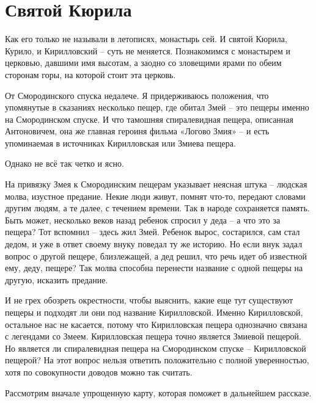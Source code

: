 \chapter{Святой Кюрила}

Как его только не называли в летописях, монастырь сей. И святой Кюрила, Курило, и Кирилловский – суть не меняется. Познакомимся с монастырем и церковью, давшими имя высотам, а заодно со зловещими ярами по обеим сторонам горы, на которой стоит эта церковь.

От Смородинского спуска недалече. Я придерживаюсь положения, что упомянутые в сказаниях несколько пещер, где обитал Змей – это пещеры именно на Смородинском спуске. И что тамошняя спиралевидная пещера, описанная Антоновичем, она же главная героиня фильма «Логово Змия» – и есть упоминаемая в источниках Кирилловская или Змиева пещера.

Однако не всё так четко и ясно.

На привязку Змея к Смородинским пещерам указывает неясная штука – людская молва, изустное предание. Некие люди живут, помнят что-то, передают словами другим людям, а те далее, с течением времени. Так в народе сохраняется память. Быть может, несколько веков назад ребенок спросил у деда – а что это за пещера? Тот вспомнил – здесь жил Змей. Ребенок вырос, состарился, сам стал дедом, и уже в ответ своему внуку поведал ту же историю. Но если внук задал вопрос о другой пещере, близлежащей, а дед решил, что речь идет об известной ему, деду, пещере? Так молва способна перенести название с одной пещеры на другую, исказить предание.

И не грех обозреть окрестности, чтобы выяснить, какие еще тут существуют пещеры и подходят ли они под название Кирилловской. Именно Кирилловской, остальное нас не касается, потому что Кирилловская пещера однозначно связана с легендами со Змеем. Кирилловская пещера точно является Змиевой пещерой. Но является ли спиралевидная пещера на Смородинском спуске – Кирилловской пещерой? На этот вопрос нельзя ответить положительно с полной уверенностью, хотя по совокупности доводов можно так считать.

Рассмотрим вначале упрощенную карту, которая поможет в дальнейшем рассказе.

